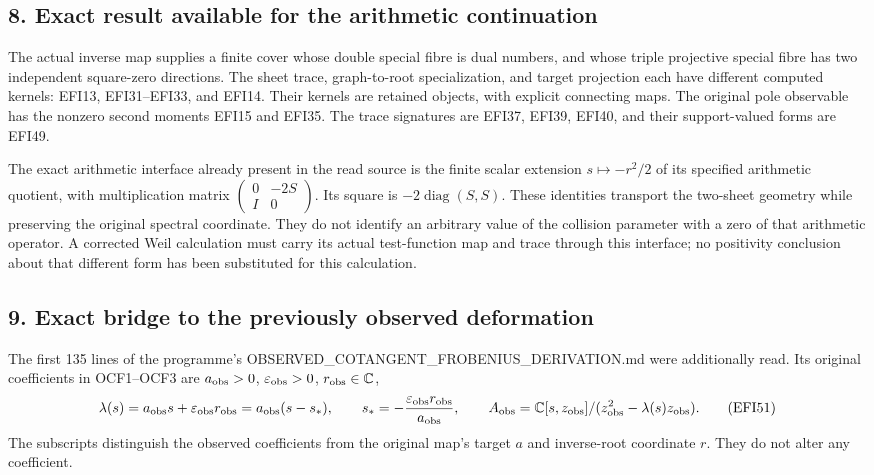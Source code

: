 \documentclass[
  10pt,
  a4paper,
]{article}
\begin{document}
\subsection{8. Exact result available for the arithmetic
continuation}\label{exact-result-available-for-the-arithmetic-continuation}

The actual inverse map supplies a finite cover whose double special
fibre is dual numbers, and whose triple projective special fibre has two
independent square-zero directions. The sheet trace, graph-to-root
specialization, and target projection each have different computed
kernels: EFI13, EFI31--EFI33, and EFI14. Their kernels are retained
objects, with explicit connecting maps. The original pole observable has
the nonzero second moments EFI15 and EFI35. The trace signatures are
EFI37, EFI39, EFI40, and their support-valued forms are EFI49.

The exact arithmetic interface already present in the read source is the
finite scalar extension \(s\mapsto-r^2/2\) of its specified arithmetic
quotient, with multiplication matrix
\(\begin{pmatrix}0&-2S\\I&0\end{pmatrix}\). Its square is
\(-2\operatorname{diag}(S,S)\). These identities transport the two-sheet
geometry while preserving the original spectral coordinate. They do not
identify an arbitrary value of the collision parameter with a zero of
that arithmetic operator. A corrected Weil calculation must carry its
actual test-function map and trace through this interface; no positivity
conclusion about that different form has been substituted for this
calculation.

\subsection{9. Exact bridge to the previously observed
deformation}\label{exact-bridge-to-the-previously-observed-deformation}

The first 135 lines of the programme's
OBSERVED\_COTANGENT\_FROBENIUS\_DERIVATION.md were additionally read.
Its original coefficients in OCF1--OCF3 are \(a_{\rm obs}>0\),
\(\varepsilon_{\rm obs}>0\), \(r_{\rm obs}\in\mathbb C\), \[
\lambda(s)=a_{\rm obs}s+\varepsilon_{\rm obs}r_{\rm obs}
=a_{\rm obs}(s-s_*),\qquad
s_*=-\frac{\varepsilon_{\rm obs}r_{\rm obs}}{a_{\rm obs}},
\qquad
A_{\rm obs}=\mathbb C[s,z_{\rm obs}]
/(z_{\rm obs}^2-\lambda(s)z_{\rm obs}).
\tag{EFI51}
\] The subscripts distinguish the observed coefficients from the
original map's target \(a\) and inverse-root coordinate \(r\). They do
not alter any coefficient.
\end{document}
